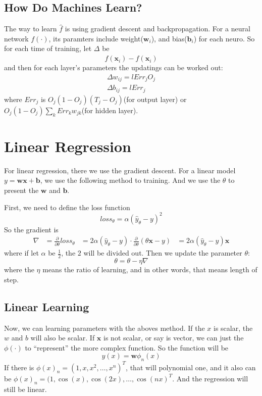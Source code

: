 \documentclass{article}
\begin{document}
\subsection{How Do Machines Learn?}
\label{sec:nn:how}

The way to learn $\hat{f}$ is using gradient descent and backpropagation.
For a neural network $f(\cdot)$, its paramters include weight($\mathbf{w}_i$),
and bias($\mathbf{b}_i$) for each neuro. So for each time of training, 
let $\Delta$ be
$$
 f(\mathbf{x}_i) - \hat{f}(\mathbf{x}_i)
$$
and then for each layer's parameters the updatings can be worked out:
\begin{align*}
  \Delta w_{ij} = l{Err_jO_j} \\
  \Delta b_{ij} = l{Err_j}
\end{align*}
where $Err_j$ is $O_j(1-O_j)(T_j-O_j)$(for output layer) or $O_j(1-O_j)\sum\limits_kErr_kw_{jk}$(for hidden layer).


\section{Linear Regression}
\label{sec:lreg}

For linear regression, there we use the gradient descent.
For a linear model $y=\mathbf{w}\mathbf{x}+\mathbf{b}$, we use the following method to training.
And we use the $\theta$ to present the $\mathbf{w}$ and $\mathbf{b}$.

First, we need  to define the loss function
\[
loss_\theta = \alpha(\hat{y}_\theta - y)^2
\]
So the gradient is
\begin{align*}
\nabla &= \frac{\partial}{\partial \theta}loss_\theta
       &= 2\alpha (\hat{y}_\theta -y)\cdot \frac{\partial}{\partial \theta}\left(\theta \mathbf{x} - y\right)
       &= 2\alpha(\hat{y}_\theta -y)\mathbf{x}
\end{align*}
where if let $\alpha$ be $\frac{1}{2}$, the $2$ will be divided out.
Then we update the parameter $\theta$:
\[
\theta = \theta - \eta\nabla
\]
where the $\eta$ means the ratio of learning, and in other words, that means length of step.

\subsection{Linear Learning}
\label{sec:lreg:how}

Now, we can learning parameters with the aboves method.
If the $x$ is scalar, the $w$ and $b$ will also be scalar. If $\mathbf{x}$ is not scalar, or say is vector,
we can just the $\phi(\cdot)$ to ``represent'' the more complex function.
So the function will be 
\[
y(x) = \mathbf{w}\phi_n(x)
\]
If there is $\phi(x)_n = (1,x,x^2,\dots,x^n)^T$, that will polynomial one, and it also can be $\phi(x)_n = (1,\cos(x),\cos(2x),\dots,\cos(nx)^T$.
And the regression will still be linear.
\end{document}
